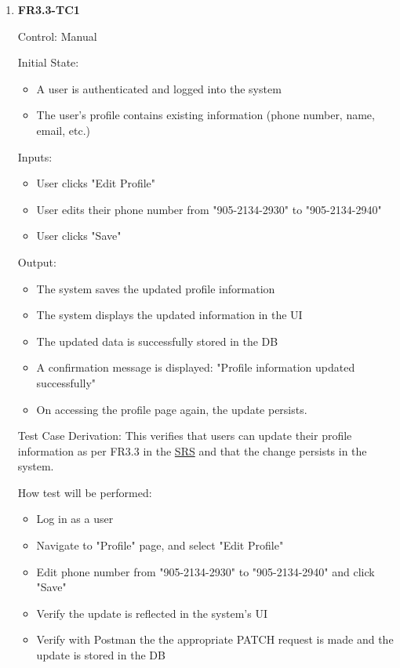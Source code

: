 \documentclass[12pt, titlepage]{article}
\begin{document}
\begin{enumerate}
    \item{\textbf{FR3.3-TC1}}
    \hypertarget{FR3.3-TC1}{}
    
    Control: Manual
    
    Initial State:
    \begin{itemize}
        \item A user is authenticated and logged into the system
        \item The user's profile contains existing information (phone number, name, email, etc.)
    \end{itemize}
    
    Inputs: 
    \begin{itemize}
        \item User clicks "Edit Profile"
        \item User edits their phone number from "905-2134-2930" to "905-2134-2940"
        \item User clicks "Save"
    \end{itemize}
    
    Output: 
    \begin{itemize}
        \item The system saves the updated profile information
        \item The system displays the updated information in the UI
        \item The updated data is successfully stored in the DB
        \item A confirmation message is displayed: "Profile information updated successfully"
        \item On accessing the profile page again, the update persists.
    \end{itemize}
    
    Test Case Derivation: This verifies that users can update their profile information as per FR3.3 in the \href{https://shorturl.at/FdAgR}{SRS} and that the change persists in the system.
    
    How test will be performed:
    \begin{itemize}
        \item Log in as a user
        \item Navigate to "Profile" page, and select "Edit Profile"
        \item Edit phone number from "905-2134-2930" to "905-2134-2940" and click "Save"
        \item Verify the update is reflected in the system's UI
        \item Verify with Postman the the appropriate PATCH request is made and the update is stored in the DB
    \end{itemize}
\end{enumerate}
\end{document}
